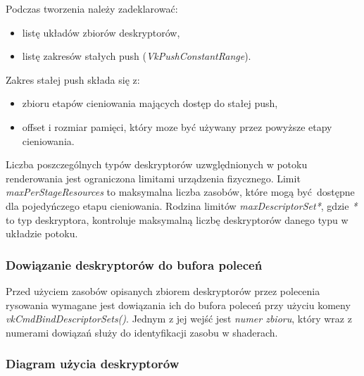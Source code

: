 Podczas tworzenia należy zadeklarować:
\begin{itemize}
	\item listę układów zbiorów deskryptorów,
	\item listę zakresów stałych push (\textit{VkPushConstantRange}).
\end{itemize}

Zakres stałej push składa się z:
\begin{itemize}
	\item zbioru etapów cieniowania mających dostęp do stałej push,
	\item offset i rozmiar pamięci, który moze być używany przez powyższe etapy cieniowania.
\end{itemize}

Liczba poszczególnych typów deskryptorów uzwględnionych w potoku renderowania jest ograniczona limitami urządzenia fizycznego.
Limit \textit{maxPerStageResources} to maksymalna liczba zasobów, które mogą być dostępne dla pojedyńczego etapu cieniowania.
Rodzina limitów \textit{maxDescriptorSet*}, gdzie \textit{*} to typ deskryptora, kontroluje maksymalną liczbę deskryptorów danego typu w układzie potoku.

\subsubsection{Dowiązanie deskryptorów do bufora poleceń}

Przed użyciem zasobów opisanych zbiorem deskryptorów przez polecenia rysowania wymagane jest dowiązania ich do bufora
poleceń przy użyciu komeny \textit{vkCmdBindDescriptorSets()}. Jednym z jej wejść jest \textit{numer zbioru}, który wraz z numerami
dowiązań służy do identyfikacji zasobu w shaderach.


\subsubsection{Diagram użycia deskryptorów}

